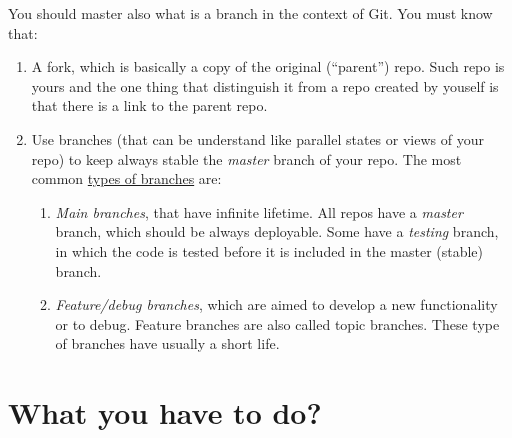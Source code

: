 You should master also what is a branch in the context of Git. You
must know that:
\begin{enumerate}
\item A fork, which is basically a copy of the original (``parent'')
  repo. Such repo is yours and the one thing that distinguish it from
  a repo created by youself is that there is a link to the parent
  repo.
\item Use branches (that can be understand like parallel states or
      views of your repo) to keep always stable the \emph{master}
      branch of your repo. The most common
      \href{https://docs.gitlab.com/ee/topics/gitlab_flow.html}{types
        of branches} are:
      \begin{enumerate}
        \item \emph{Main branches}, that have infinite lifetime. All
          repos have a \emph{master} branch, which should be always
          deployable. Some have a \emph{testing} branch, in which the
          code is tested before it is included in the master (stable)
          branch.
        \item \emph{Feature/debug branches}, which are aimed to
          develop a new functionality or to debug. Feature branches
          are also called topic branches. These type of branches have
          usually a short life.
      \end{enumerate}
  \end{enumerate}


\section{What you have to do?}

